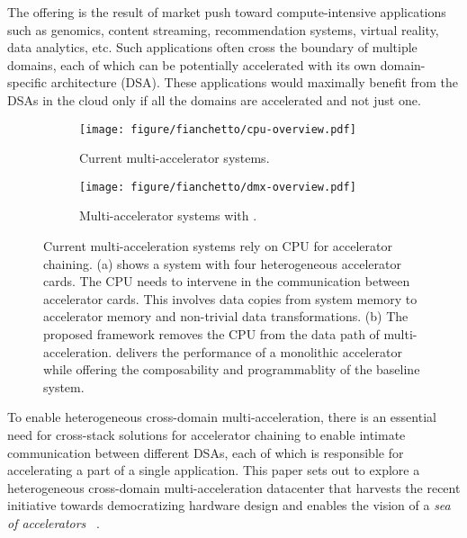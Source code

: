 The offering is the result of market push toward compute-intensive applications such as genomics, content streaming, recommendation systems, virtual reality, data analytics, etc. 
%
Such applications often cross the boundary of multiple domains, each of which can be potentially accelerated with its own domain-specific architecture (DSA). 
%
These applications would maximally benefit from the DSAs in the cloud only if all the domains are accelerated and not just one. 
%

%
\begin{figure}[ht!]
    \centering
    \begin{subfigure}[b]{\columnwidth}
    \texttt{[image: figure/fianchetto/cpu-overview.pdf]}
    \caption{Current multi-accelerator systems.}
    \label{fig:overview:current}
    \end{subfigure}
    \hspace{0.5in}
    \begin{subfigure}[b]{\columnwidth}
    \texttt{[image: figure/fianchetto/dmx-overview.pdf]}
    \caption{Multi-accelerator systems with \dmx.}
    \label{fig:overview:dmx}
    \end{subfigure}
    \caption{Current multi-acceleration systems rely on CPU for accelerator chaining. (a) shows a system with four heterogeneous accelerator cards. The CPU needs to intervene in the communication between accelerator cards. This involves data copies from system memory to accelerator memory and non-trivial data transformations. (b) The proposed \dmx framework removes the CPU from the data path of multi-acceleration. \dmx delivers the performance of a monolithic accelerator while offering the composability and programmablity of the baseline system.}
    
\label{fig:overview}
\end{figure}

To enable heterogeneous cross-domain multi-acceleration, there is an essential need for cross-stack solutions for accelerator chaining to enable intimate communication between different DSAs, each of which is responsible for accelerating a part of a single application. 
%
This paper sets out to explore a heterogeneous cross-domain multi-acceleration datacenter that harvests the recent initiative towards democratizing hardware design and enables the vision of a \textit{sea of accelerators}
~\cite{pymtl3:ieee-micro:2020, basejump:dac:2018, blackparrot:ieee-micro:2020, democratizing:cacm:2022, profiling:isca:2023}.

